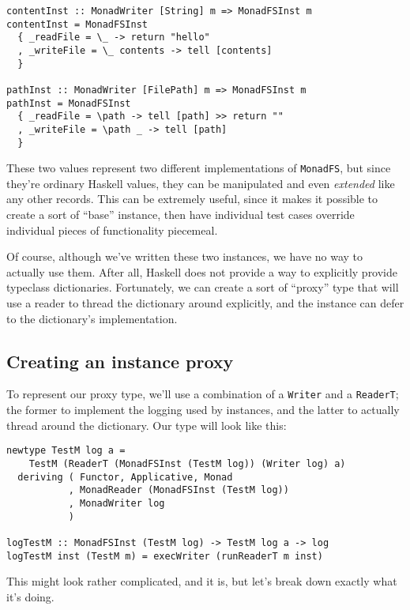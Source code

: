 \begin{verbatim}
contentInst :: MonadWriter [String] m => MonadFSInst m
contentInst = MonadFSInst
  { _readFile = \_ -> return "hello"
  , _writeFile = \_ contents -> tell [contents]
  }

pathInst :: MonadWriter [FilePath] m => MonadFSInst m
pathInst = MonadFSInst
  { _readFile = \path -> tell [path] >> return ""
  , _writeFile = \path _ -> tell [path]
  }
\end{verbatim}
These two values represent two different implementations of
\texttt{MonadFS}, but since they're ordinary Haskell values, they can be
manipulated and even \emph{extended} like any other records. This can be
extremely useful, since it makes it possible to create a sort of
``base'' instance, then have individual test cases override individual
pieces of functionality piecemeal.

Of course, although we've written these two instances, we have no way to
actually use them. After all, Haskell does not provide a way to
explicitly provide typeclass dictionaries. Fortunately, we can create a
sort of ``proxy'' type that will use a reader to thread the dictionary
around explicitly, and the instance can defer to the dictionary's
implementation.

\subsection{Creating an instance
proxy}\label{creating-an-instance-proxy}

To represent our proxy type, we'll use a combination of a
\texttt{Writer} and a \texttt{ReaderT}; the former to implement the
logging used by instances, and the latter to actually thread around the
dictionary. Our type will look like this:

\begin{verbatim}
newtype TestM log a =
    TestM (ReaderT (MonadFSInst (TestM log)) (Writer log) a)
  deriving ( Functor, Applicative, Monad
           , MonadReader (MonadFSInst (TestM log))
           , MonadWriter log
           )

logTestM :: MonadFSInst (TestM log) -> TestM log a -> log
logTestM inst (TestM m) = execWriter (runReaderT m inst)
\end{verbatim}
This might look rather complicated, and it is, but let's break down
exactly what it's doing.

